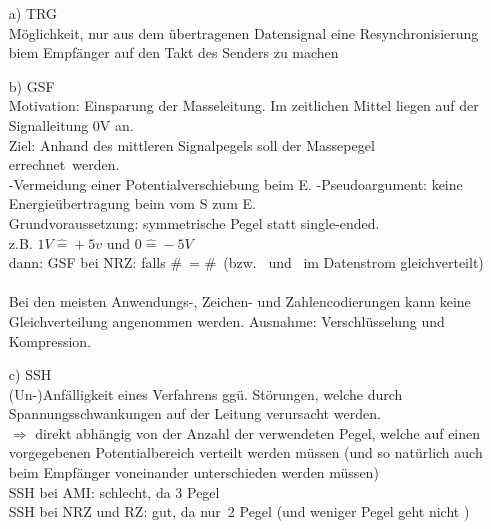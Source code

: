 \documentclass[10pt,a4paper]{scrartcl}
\begin{document}
\begin{enumerate}
	\item[a)] \ac{TRG}\\
	Möglichkeit, nur aus dem übertragenen Datensignal eine Resynchronisierung biem Empfänger auf den Takt des Senders zu machen
	
	\item[b)] \ac{GSF} \\
	Motivation: Einsparung der Masseleitung. Im zeitlichen Mittel liegen auf der Signalleitung 0V an.\\
	Ziel: Anhand des mittleren Signalpegels soll der Massepegel \glqq errechnet\grqq\ werden.\\
	\subitem -Vermeidung einer Potentialverschiebung beim E.
	\subitem -Pseudoargument: keine Energieübertragung beim vom S zum E.\\
	Grundvoraussetzung: symmetrische Pegel statt single-ended. \\
	z.B. $1V \hat{=} +5v$ und $0 \hat{=} -5V$\\
	dann: \ac{GSF} bei \ac{NRZ}: falls \#\grqq\ = \#\grqq\ (bzw. \grqq\ und \grqq\ im Datenstrom gleichverteilt)\\\\
	Bei den meisten Anwendungs-, Zeichen- und Zahlencodierungen kann keine Gleichverteilung angenommen werden. Ausnahme: Verschlüsselung und Kompression.
	\item[c)] \ac{SSH}\\
	(Un-)Anfälligkeit eines Verfahrens ggü. Störungen, welche durch Spannungsschwankungen auf der Leitung verursacht werden.\\
	$\Rightarrow$ direkt abhängig von der Anzahl der verwendeten Pegel, welche auf einen vorgegebenen Potentialbereich verteilt werden müssen (und so natürlich auch beim Empfänger voneinander unterschieden werden müssen)\\
	\ac{SSH} bei \ac{AMI}: schlecht, da 3 Pegel\\
	\ac{SSH} bei \ac{NRZ} und \ac{RZ}: gut, da \glqq nur\grqq\ 2 Pegel (und weniger Pegel geht nicht \smiley{})
\end{enumerate}
\end{document}
